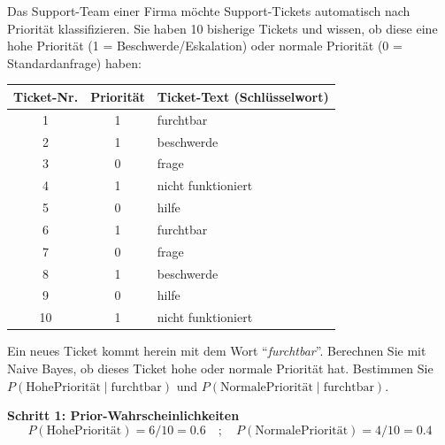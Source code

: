 \begin{myexercise}
    \label{ex:ticket-prioritization}
    Das Support-Team einer Firma möchte Support-Tickets automatisch nach Priorität klassifizieren. Sie haben 10 bisherige Tickets und wissen, ob diese eine hohe Priorität (1 = Beschwerde/Eskalation) oder normale Priorität (0 = Standardanfrage) haben:

    \begin{table}[H]
        \centering
        \begin{tabular}{ccl}
            \textbf{Ticket-Nr.} & \textbf{Priorität} & \textbf{Ticket-Text (Schlüsselwort)} \\
            \midrule
            1                   & 1                  & furchtbar                            \\
            2                   & 1                  & beschwerde                           \\
            3                   & 0                  & frage                                \\
            4                   & 1                  & nicht funktioniert                   \\
            5                   & 0                  & hilfe                                \\
            6                   & 1                  & furchtbar                            \\
            7                   & 0                  & frage                                \\
            8                   & 1                  & beschwerde                           \\
            9                   & 0                  & hilfe                                \\
            10                  & 1                  & nicht funktioniert                   \\
        \end{tabular}
    \end{table}

    Ein neues Ticket kommt herein mit dem Wort \enquote{\textit{furchtbar}}. Berechnen Sie mit Naive Bayes, ob dieses Ticket hohe oder normale Priorität hat. Bestimmen Sie $P(\text{HohePriorität}\mid\text{furchtbar})$ und $P(\text{NormalePriorität}\mid\text{furchtbar})$.

    \begin{myanswer}
        \textbf{Schritt 1: Prior-Wahrscheinlichkeiten}
        \[
            P(\text{HohePriorität}) = 6/10 = 0.6 \quad ; \quad P(\text{NormalePriorität}) = 4/10 = 0.4
        \]


\end{myanswer}
\end{myexercise}
